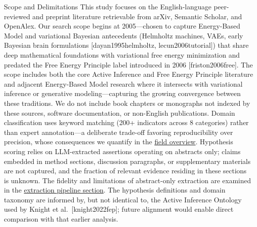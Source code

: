 \documentclass[
  ignorenonframetext,
]{beamer}
\providecommand{\citep}[1]{[#1]}
\begin{document}
\begin{frame}[allowframebreaks]{Scope and Delimitations}
\protect{}\label{scope-and-delimitations}
This study focuses on the English-language peer-reviewed and preprint
literature retrievable from arXiv, Semantic Scholar, and OpenAlex. Our
search scope begins at 2005---chosen to capture Energy-Based Model and
variational Bayesian antecedents (Helmholtz machines, VAEs, early
Bayesian brain formulations
\citep{dayan1995helmholtz, lecun2006tutorial}) that share deep
mathematical foundations with variational free energy minimization and
predated the Free Energy Principle label introduced in 2006
\citep{friston2006free}. The scope includes both the core Active
Inference and Free Energy Principle literature and adjacent Energy-Based
Model research where it intersects with variational inference or
generative modeling---capturing the growing convergence between these
traditions. We do not include book chapters or monographs not indexed by
these sources, software documentation, or non-English publications.
Domain classification uses keyword matching (200+ indicators across 8
categories) rather than expert annotation---a deliberate trade-off
favoring reproducibility over precision, whose consequences we quantify
in the \hyperref[sec:field_overview]{field overview}. Hypothesis scoring
relies on LLM-extracted assertions operating on abstracts only; claims
embedded in method sections, discussion paragraphs, or supplementary
materials are not captured, and the fraction of relevant evidence
residing in these sections is unknown. The fidelity and limitations of
abstract-only extraction are examined in the
\hyperref[sec:extraction_pipeline]{extraction pipeline section}. The
hypothesis definitions and domain taxonomy are informed by, but not
identical to, the Active Inference Ontology used by Knight et
al.~\citep{knight2022fep}; future alignment would enable direct
comparison with that earlier analysis.
\end{frame}
\end{document}
